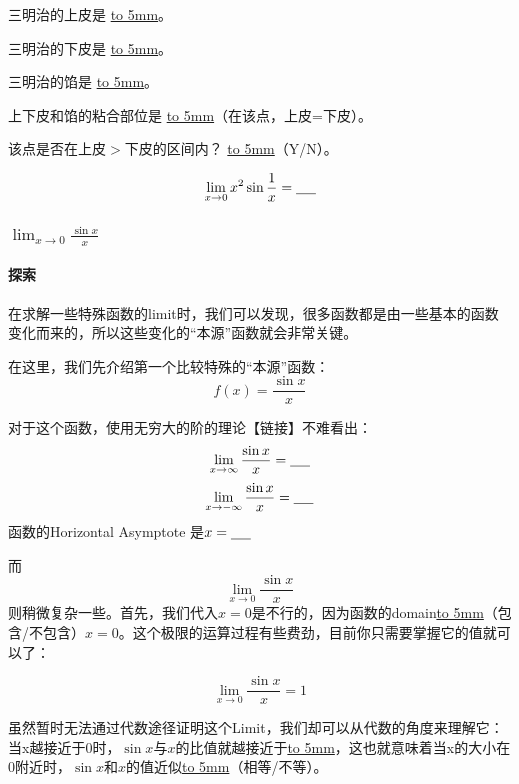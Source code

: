 \documentclass[UTF8]{ctexart}
\begin{document}
三明治的上皮是 \underline{\hbox to 5mm{}}。

三明治的下皮是 \underline{\hbox to 5mm{}}。

三明治的馅是 \underline{\hbox to 5mm{}}。

上下皮和馅的粘合部位是 \underline{\hbox to 5mm{}}（在该点，上皮=下皮）。

该点是否在上皮$>$下皮的区间内？ \underline{\hbox to 5mm{}}（Y/N）。

\[{\lim_{x \to 0} x^2\sin{\frac{1}{x}}} = \underline{\hbox to 5mm{}}\]

\subsubsection{${\lim_{x \to 0} \frac{\sin{x}}{x}}$}
\paragraph{探索}

在求解一些特殊函数的limit时，我们可以发现，很多函数都是由一些基本的函数变化而来的，所以这些变化的“本源”函数就会非常关键。

在这里，我们先介绍第一个比较特殊的“本源”函数：
\[f(x) = \frac{\sin{x}}{x}\]
\begin{center}
\end{center}  

对于这个函数，使用无穷大的阶的理论【链接】不难看出：
\[ {\lim_{x \to \infty} \frac{\sin{x}}{x}} =  \underline{\hbox to 5mm{}}\]
\[ {\lim_{x \to -\infty} \frac{\sin{x}}{x}} =  \underline{\hbox to 5mm{}}\]
函数的Horizontal Asymptote 是$x = \underline{\hbox to 5mm{}}$

而\[\lim_{x \to 0} \frac{\sin{x}}{x}\] 则稍微复杂一些。首先，我们代入$x = 0$是不行的，因为函数的domain\underline{\hbox to 5mm{}}（包含/不包含）$x=0$。这个极限的运算过程有些费劲，目前你只需要掌握它的值就可以了：

\[{\lim_{x \to 0} \frac{\sin{x}}{x}} =  1\]

虽然暂时无法通过代数途径证明这个Limit，我们却可以从代数的角度来理解它：当x越接近于0时，$\sin{x}$与$x$的比值就越接近于\underline{\hbox to 5mm{}}，这也就意味着当x的大小在0附近时，$\sin{x}$和$x$的值近似\underline{\hbox to 5mm{}}（相等/不等）。
\end{document}
